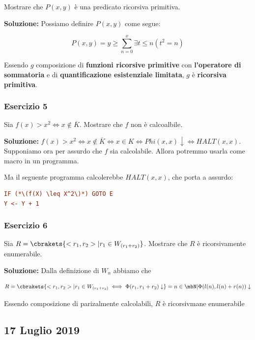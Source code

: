 Mostrare che \(P(x,y)\) è una predicato ricorsiva primitiva.

\textbf{Soluzione:} Possiamo definire \(P(x,y)\) come segue:

\begin{equation}
  P(x,y) = y \geq \sum_{n=0}^{x} \exists t \leq n (t^2=n)
\end{equation}

Essendo \(g\) composizione di \textbf{funzioni ricorsive primitive} con \textbf{l'operatore di sommatoria} e di \textbf{quantificazione esistenziale limitata}, \(g\) è \textbf{ricorsiva primitiva}.

\subsubsection{Esercizio 5}

Sia \(f(x)>x^2 \iff x \nin \overline{K}\). Mostrare che \(f\) non è calcoalbile.

\textbf{Soluzione:} \(f(x)>x^2 \iff x \nin \overline{K} \iff x \in K \iff Phi(x,x) \downarrow \iff \textit{HALT}(x,x)\). Supponiamo ora per assurdo che \(f\) sia calcolabile. Allora potremmo usarla come macro in un programma.

Ma il seguente programma calcolerebbe \(\textit{HALT}(x,x)\), che porta a assurdo:

\begin{lstlisting}[language=ini, caption={ }]
IF (*\(f(X) \leq X^2\)*) GOTO E
Y <- Y + 1
\end{lstlisting}

\subsubsection{Esercizio 6}

Sia \(R=\cbrakets{<r_1,r_2> \vert r_1 \in W_{(r_1+r_2)}}\). Mostrare che \(R\) è ricorsivamente enumerabile.

\textbf{Soluzione:} Dalla definizione di \(W_n\) abbiamo che

\begin{equation}
  R=\cbrakets{<r_1,r_2> \vert r_1 \in W_{(r_1+r_2)} \iff \Phi(r_1,r_1+r_2) \downarrow}={n \in \mbN \vert \Phi(l(n), l(n) + r(n)) \downarrow}
\end{equation}

Essendo composizione di parizalmente calcolabili, \(R\) è ricorsivmane enumerabile

\subsection{17 Luglio 2019}


